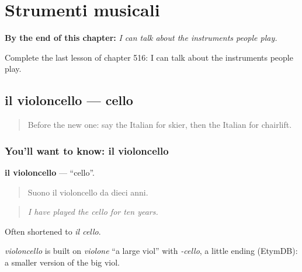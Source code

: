 
\chapter{Strumenti musicali}
\label{ch:it-strumenti-musicali}

\begin{chapteropening}
\textbf{By the end of this chapter:} \emph{I can talk about the instruments people play.}

Complete the last lesson of chapter 516: I can talk about the instruments people play.
\end{chapteropening}

\section[il violoncello]{il violoncello — cello}

\label{lesson:IT-C516-violoncello}



\begin{quote}
Before the new one: say the Italian for skier, then the Italian for chairlift.
\end{quote}

\subsection*{You'll want to know: il violoncello}
\textbf{il violoncello} — \textquotedblleft{}cello\textquotedblright{}.

\begin{quote}
Suono il violoncello da dieci anni.
\end{quote}

\begin{quote}
\emph{I have played the cello for ten years.}
\end{quote}

Often shortened to \emph{il cello}.

\begin{cousinweb}
\emph{violoncello} is built on \emph{violone} \textquotedblleft{}a large viol\textquotedblright{} with \emph{-cello}, a little ending (EtymDB): a smaller version of the big viol.
\end{cousinweb}

